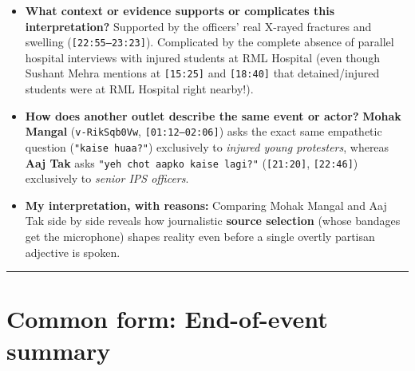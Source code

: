 \documentclass[10pt,a4paper]{article}
\begin{document}
\begin{itemize}[leftmargin=1.5em, itemsep=3pt, topsep=4pt]
  \item \textbf{What context or evidence supports or complicates this interpretation?} Supported by the officers' real X-rayed fractures and swelling (\texttt{[22:55--23:23]}). Complicated by the complete absence of parallel hospital interviews with injured students at RML Hospital (even though Sushant Mehra mentions at \texttt{[15:25]} and \texttt{[18:40]} that detained/injured students were at RML Hospital right nearby!).
  \item \textbf{How does another outlet describe the same event or actor?} \textbf{Mohak Mangal} (\texttt{v-RikSqb0Vw}, \texttt{[01:12--02:06]}) asks the exact same empathetic question (\texttt{"kaise huaa?"}) exclusively to \textit{injured young protesters}, whereas \textbf{Aaj Tak} asks \texttt{"yeh chot aapko kaise lagi?"} (\texttt{[21:20]}, \texttt{[22:46]}) exclusively to \textit{senior IPS officers}.
  \item \textbf{My interpretation, with reasons:} Comparing Mohak Mangal and Aaj Tak side by side reveals how journalistic \textbf{source selection} (whose bandages get the microphone) shapes reality even before a single overtly partisan adjective is spoken.
\end{itemize}
\vspace{4pt}\noindent\rule{\textwidth}{0.4pt}\vspace{4pt}

\section*{Common form: End-of-event summary}
\end{document}
